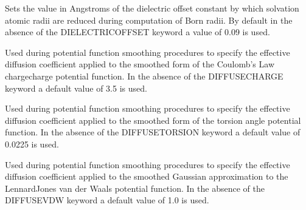 \documentclass[letterpaper,11pt,english]{sphinxmanual}
\begin{document}
\ignorespaces {}\label{\detokenize{text/keywords:key-dielectric-offset}}\begin{description}
\sphinxAtStartPar
Sets the value in Angstroms of the dielectric offset constant by which solvation atomic radii are reduced during computation of Born radii. By default in the absence of the DIELECTRIC\sphinxhyphen{}OFFSET keyword a value of 0.09 is used.

\end{description}

\ignorespaces {}\label{\detokenize{text/keywords:key-diffuse-charge}}\begin{description}
\sphinxAtStartPar
Used during potential function smoothing procedures to specify the effective diffusion coefficient applied to the smoothed form of the Coulomb’s Law charge\sphinxhyphen{}charge potential function. In the absence of the DIFFUSE\sphinxhyphen{}CHARGE keyword a default value of 3.5 is used.

\end{description}

\ignorespaces {}\label{\detokenize{text/keywords:key-diffuse-torsion}}\begin{description}
\sphinxAtStartPar
Used during potential function smoothing procedures to specify the effective diffusion coefficient applied to the smoothed form of the torsion angle potential function. In the absence of the DIFFUSE\sphinxhyphen{}TORSION keyword a default value of 0.0225 is used.

\end{description}

\ignorespaces {}\label{\detokenize{text/keywords:key-diffuse-vdw}}\begin{description}
\sphinxAtStartPar
Used during potential function smoothing procedures to specify the effective diffusion coefficient applied to the smoothed Gaussian approximation to the Lennard\sphinxhyphen{}Jones van der Waals potential function. In the absence of the DIFFUSE\sphinxhyphen{}VDW keyword a default value of 1.0 is used.

\end{description}
\end{document}
